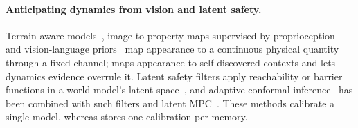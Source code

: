 \paragraph{Anticipating dynamics from vision and latent safety.}
Terrain-aware models~\citep{gibson2024visualterrain,agarwal2022egocentric,brunzema2026vcvbll}, image-to-property maps supervised by proprioception~\citep{loquercio2022crossmodal,margolis2023activesensing} and vision-language priors~\citep{gao2024physically,wang2026phys2real} map appearance to a continuous physical quantity through a fixed channel; \method maps appearance to self-discovered contexts and lets dynamics evidence overrule it. Latent safety filters apply reachability or barrier functions in a world model's latent space~\citep{nakamura2025latent,nakamura2026latentcbf,seo2025uncertainty}, and adaptive conformal inference~\citep{gibbs2021adaptive} has been combined with such filters and latent MPC~\citep{huriot2026safe,nath2026pixels}. These methods calibrate a single model, whereas \method stores one calibration per memory.
